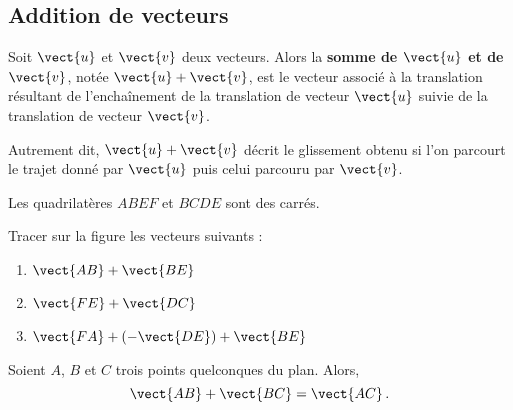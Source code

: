 \documentclass{article}
\begin{document}
\newpage

\subsection{Addition de vecteurs}
\begin{tcolorbox}
\begin{definition}
Soit $\vect{u}$ et $\vect{v}$ deux vecteurs. Alors la \textbf{somme de $\vect{u}$ et de $\vect{v}$}, notée $\vect{u} + \vect{v}$, est le vecteur associé à la translation résultant de l'enchaînement de la translation de vecteur $\vect{u}$ suivie de la translation de vecteur $\vect{v}$.
\end{definition}
\end{tcolorbox}
\begin{remark}
Autrement dit, $\vect{u} + \vect{v}$ décrit le glissement obtenu si l'on parcourt le trajet donné par $\vect{u}$ puis celui parcouru par $\vect{v}$.
\end{remark}
\begin{example}
Les quadrilatères $ABEF$ et $BCDE$ sont des carrés.
\begin{center}
\end{center}
Tracer sur la figure les vecteurs suivants :
\begin{enumerate}[label=\emph{\alph*)}]
\item $\vect{AB} + \vect{BE}$
\item $\vect{FE} + \vect{DC}$
\item $\vect{FA} + (- \vect{DE}) + \vect{BE}$
\end{enumerate}
\end{example}
\begin{tcolorbox}
\begin{proposition}
Soient $A$, $B$ et $C$ trois points quelconques du plan. Alors,
\begin{equation*}
\vect{AB} + \vect{BC} = \vect{AC}\,.
\end{equation*}
\end{proposition}
\end{tcolorbox}
\end{document}
